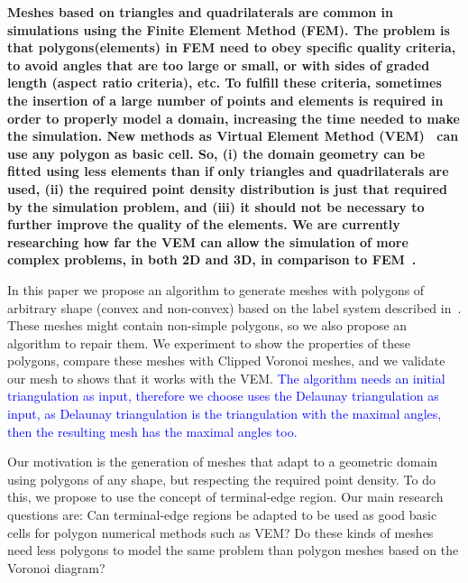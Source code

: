 \textbf{Meshes based on triangles and quadrilaterals are common in simulations using the Finite Element Method (FEM). The problem is that polygons(elements) in FEM need to obey specific quality criteria, to avoid angles that are too large or small, or with sides of graded  length (aspect ratio criteria), etc. To fulfill these criteria, sometimes the insertion of a large number of points and elements is required in order to properly model a domain, increasing the time needed to make the simulation. New methods as Virtual Element Method (VEM)~\cite{Basisprinciples,Brezzi2015} can use any polygon as basic cell. So, (i) the domain geometry can be fitted using  less elements than if only triangles and quadrilaterals are used, (ii) the required point density distribution is just that required by the simulation problem, and (iii) it should not be necessary to further improve the quality of the elements. We are currently researching how far the VEM can allow the simulation of more complex problems, in both 2D and 3D, in comparison to FEM~\cite{Wriggers2019}.}








In this paper we propose an algorithm to generate meshes with polygons of arbitrary shape (convex and non-convex) based on the label system described in~\cite{Ojeda2018ANA}. These meshes might contain non-simple polygons, so we also propose an algorithm to repair them. We  experiment to show the properties of these polygons, compare these meshes with Clipped Voronoi meshes, and we validate our mesh to shows that it works with the VEM. \textcolor{blue}{The algorithm needs an initial triangulation as input, therefore we choose uses the Delaunay triangulation as input, as Delaunay triangulation is the triangulation with the maximal angles, then the resulting mesh has the maximal angles too.}

Our motivation is the generation of meshes that adapt to a geometric domain using  polygons of any shape, but respecting the required point density. To do this, we propose to use the concept of terminal-edge region. Our main research questions are: Can terminal-edge regions be adapted to be used as good basic cells for polygon numerical methods such as VEM? Do these kinds of meshes need less polygons to model the same problem than polygon meshes based on the Voronoi diagram? 

